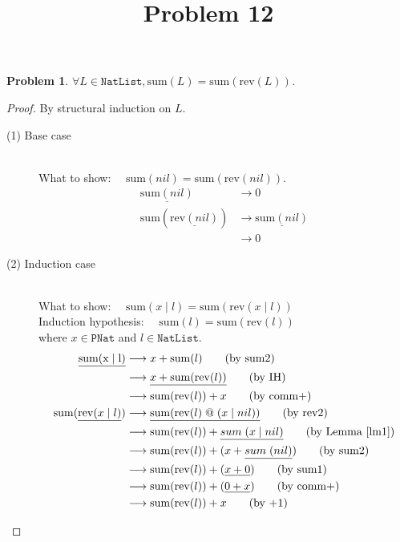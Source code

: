 \documentclass[12pt, a4paper]{article}
\title{Problem 12}
\date{\vspace{-5ex}}
\newtheorem{problem}{Problem}
\newcommand{\rel}[1]{\mathrel{#1}}
\newcommand{\rmx}[1]{\mathrm{#1}}
\newcommand{\larrow}{\longrightarrow}
\newcommand{\under}{\underline}
\begin{document}
\maketitle

\begin{problem}
$\forall L \in \mathtt{NatList}, \rmx{sum}(L) = \rmx{sum}(\rmx{rev}(L))$.
\end{problem}
\begin{proof}
By structural induction on $L$.

\begin{description}
\item[(1) Base case]~\\
\noindent
What to show: $\quad \rmx{sum}(nil) = \rmx{sum}(\rmx{rev}(nil))$.
\begin{align*}
\under{\rmx{sum}(nil)} &\larrow 0 \tag{by sum1} \\
\rmx{sum}(\under{\rmx{rev}(nil)})
	&\larrow \under{\rmx{sum}(nil)} \tag{by rev1} \\
	&\larrow 0 \tag{by sum1}
\end{align*}

\item[(2) Induction case]~\\
What to show: $\quad \rmx{sum}(x \mid l) = \rmx{sum}(\rmx{rev}(x \mid l))$ \\
Induction hypothesis: $\quad \rmx{sum}(l) = \rmx{sum}(\rmx{rev}(l))$  \\
where $x \in \mathtt{PNat}$ and $l \in \mathtt{NatList}$.
\begin{align*}
\under{\rmx{sum(x \mid l)}}
	&\larrow x + \rmx{sum}(l) \tag{by sum2} \\
	&\larrow \under{x + \rmx{sum}(\rmx{rev}(l))} \tag{by IH} \\
	&\larrow \rmx{sum}(\rmx{rev}(l)) + x \tag{by comm+} \\
\rmx{sum}(\under{\rmx{rev}(x \mid l)})
	&\larrow \under{\rmx{sum}(\rmx{rev}(l) \rel{@} (x \mid nil))} \tag{by rev2} \\
	&\larrow \rmx{sum}(\rmx{rev}(l)) + \under{\rel{sum}(x \mid nil)} \tag{by Lemma~\ref{lm1}} \\
	&\larrow \rmx{sum}(\rmx{rev}(l)) + (x + \under{\rel{sum}(nil)}) \tag{by sum2} \\
	&\larrow \rmx{sum}(\rmx{rev}(l)) + (\under{x + 0}) \tag{by sum1} \\
	&\larrow \rmx{sum}(\rmx{rev}(l)) + (\under{0 + x}) \tag{by comm+} \\
	&\larrow \rmx{sum}(\rmx{rev}(l)) + x \tag{by +1}
\end{align*}
\end{description}

\end{proof}
\end{document}
